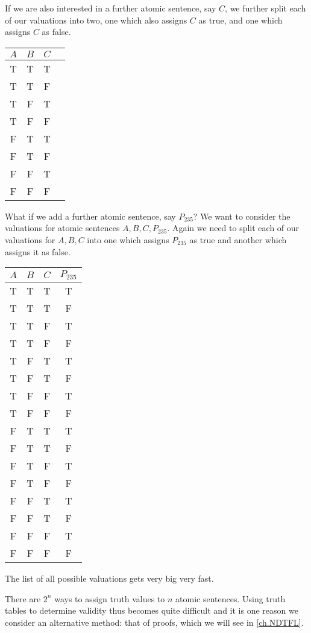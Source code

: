 If we are also interested in a further atomic sentence, say $C$, we further split each of our valuations into two, one which also assigns $C$ as true, and one which assigns $C$ as false.

\begin{center}
	\begin{tabular}{cccc}
		$A$&$B$&$C$&\\\hline
		T& T &T&\\
		T & T & F&\\
		T & F & T& \\
		T & F &F&\\
		F & T &T&\\
		F& T & F & \\
		F & F & T &\\
		F & F & F& 
	\end{tabular}
\end{center}


What if we add a further atomic sentence, say $P_{235}$? We want to consider the valuations for atomic sentences $A,B,C,P_{235}$.
Again we need to split each of our valuations for $A,B,C$ into one which assigns $P_{235}$ as true and another which assigns it as false. 

\begin{center} \begin{tabular}{cccc} $A$ & $B$ & $C$ & $P_{235}$\\\hline T & T & T & T\\ T & T & T & F\\ T & T & F & T\\ T & T & F & F\\ T & F & T & T\\ T & F & T & F\\ T & F & F & T\\ T & F & F & F\\ F & T & T & T\\ F & T & T & F\\ F & T & F & T\\ F & T & F & F\\ F & F & T & T\\ F & F & T & F\\ F & F & F & T\\ F & F & F & F \end{tabular} \end{center}


The list of all possible valuations gets very big very fast.

There are $2^n$ ways to assign truth values to $n$ atomic sentences. Using truth tables to determine validity thus becomes quite difficult and it is one reason we consider an alternative method: that of proofs, which we will see in \ref{ch.NDTFL}.


